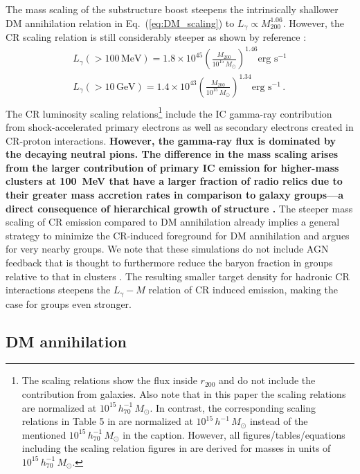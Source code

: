 \documentclass[10pt,aps,pra,reprint,amsmath,amsfonts,amssymb,showpacs,nofootinbib,floatfix]{revtex4-1}
\def\C#1{{\bf #1}}
\newcommand{\rmn}{\mathrm}
\newcommand{\msun}{M_\odot}
\newcommand{\mev}{\rmn{MeV}}
\newcommand{\gev}{\rmn{GeV}}
\newcommand{\rvir}{r_{200}}
\newcommand{\mvir}{M_{200}}
\begin{document}
The mass scaling of the substructure boost steepens the intrinsically
shallower DM annihilation relation in Eq.~(\ref{eq:DM_scaling}) to
$L_\gamma\propto \mvir^{1.06}$. However, the CR scaling relation is
still considerably steeper as shown by reference
  \cite{2010MNRAS.409..449P}:
\begin{eqnarray}
L_{\gamma}(>100\,\mev) = 1.8\times10^{45}
\left(\frac{\mvir}{10^{15}\,\msun}\right)^{1.46}\mbox{erg~s}^{-1}\nonumber\\
L_{\gamma}(>10\,\gev) = 1.4\times10^{43}
\left(\frac{\mvir}{10^{15}\,\msun}\right)^{1.34}\mbox{erg~s}^{-1}\,.\nonumber\\
\end{eqnarray}
The CR luminosity scaling relations\footnote{The scaling relations
  show the flux inside $\rvir$ and do not include the contribution
  from galaxies. Also note that in this paper the scaling relations
  are normalized at $10^{15}\,h_{70}^{-1}\,\msun$. In contrast, the
  corresponding scaling relations in Table 5 in
  \cite{2010MNRAS.409..449P} are normalized at
  $10^{15}\,h^{-1}\,\msun$ instead of the mentioned
  $10^{15}\,h_{70}^{-1}\,\msun$ in the caption. However, all
  figures/tables/equations including the scaling relation figures in
  \cite{2010MNRAS.409..449P} are derived for masses in units of
  $10^{15}\,h_{70}^{-1}\,\msun$.} include the IC gamma-ray
contribution from shock-accelerated primary electrons as well as
secondary electrons created in CR-proton interactions. \C{However, the
  gamma-ray flux is dominated by the decaying neutral pions. The
  difference in the mass scaling arises from the larger contribution
  of primary IC emission for higher-mass clusters at 100~MeV that have
  a larger fraction of radio relics due to their greater mass
  accretion rates in comparison to galaxy groups---a direct
  consequence of hierarchical growth of structure \protect
  \cite{2009ApJ...707..354Z,2011arXiv1106.5505P}.} The steeper mass
scaling of CR emission compared to DM annihilation already implies a
general strategy to minimize the CR-induced foreground for DM
annihilation and argues for very nearby groups. We note that these
simulations do not include AGN feedback that is thought to furthermore
reduce the baryon fraction in groups relative to that in clusters
\cite{2008ApJ...687L..53P}. The resulting smaller target density for
hadronic CR interactions steepens the $L_\gamma-M$ relation of CR
induced emission, making the case for groups even stronger.

\subsection{DM annihilation}
\end{document}
